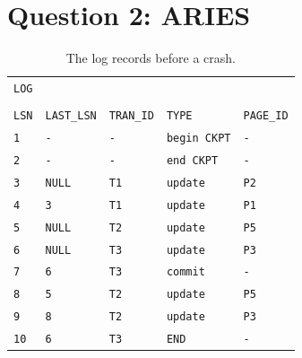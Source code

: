 \documentclass[12pt]{article}
\begin{document}
\section*{Question 2: ARIES}
\begin{table}[h!]
\begin{tabular*}{\textwidth}{@{\extracolsep{\fill}}lllll}
\texttt{LOG}&&&& \\
&&&&\\
\texttt{LSN} & \texttt{LAST\_LSN} & \texttt{TRAN\_ID} & \texttt{TYPE} & \texttt{PAGE\_ID} \\
\texttt{1} & \texttt{-} & \texttt{-} & \texttt{begin CKPT} & \texttt{-} \\
\texttt{2} & \texttt{-} & \texttt{-} & \texttt{end CKPT} & \texttt{-} \\
\texttt{3} & \texttt{NULL} & \texttt{T1} & \texttt{update} & \texttt{P2} \\
\texttt{4} & \texttt{3} &\texttt{T1} & \texttt{update} & \texttt{P1} \\
\texttt{5} & \texttt{NULL} & \texttt{T2} & \texttt{update} & \texttt{P5} \\
\texttt{6} & \texttt{NULL} & \texttt{T3} & \texttt{update} & \texttt{P3} \\
\texttt{7} & \texttt{6} & \texttt{T3} & \texttt{commit} & \texttt{-} \\
\texttt{8} & \texttt{5} & \texttt{T2} & \texttt{update} & \texttt{P5} \\
\texttt{9} & \texttt{8} & \texttt{T2} & \texttt{update} & \texttt{P3} \\
\texttt{10} & \texttt{6} & \texttt{T3} & \texttt{END} & \texttt{-} \\
\end{tabular*}
\caption{The log records before a crash.}
\label{log}
\end{table}
\end{document}
